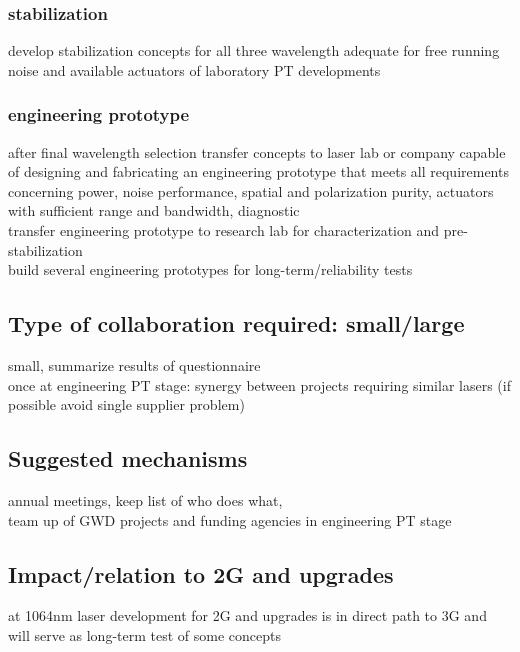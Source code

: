 \subsubsection*{stabilization}
develop stabilization concepts for all three wavelength adequate for free running noise and available actuators of laboratory PT developments
\subsubsection{engineering prototype}
after final wavelength selection transfer concepts to laser lab or company capable of designing and fabricating an engineering prototype that meets all requirements concerning power, noise performance, spatial and polarization purity, actuators with sufficient range and bandwidth, diagnostic\\
transfer engineering prototype to research lab for characterization and pre-stabilization\\
build several engineering prototypes for long-term/reliability tests
\subsection{Type of collaboration required:  small/large}
small, summarize results of questionnaire\\
once at engineering PT stage: synergy between projects requiring similar lasers (if possible avoid single supplier problem)

\subsection{Suggested mechanisms}
annual meetings, keep list of who does what,\\
team up of GWD projects and funding agencies in engineering PT stage
\subsection{Impact/relation to 2G and upgrades}
at 1064nm laser development for 2G and upgrades is in direct path to 3G and will serve as long-term test of some concepts
